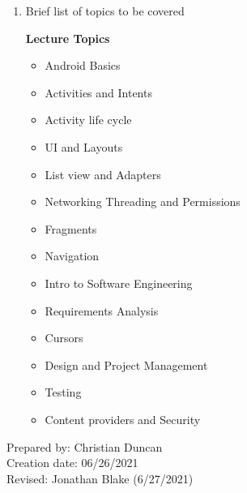 \begin{enumerate}[1.]
\item Brief list of topics to be covered\\
  {\bfseries
    Lecture Topics
    \begin{itemize}
      \item Android Basics
      \item Activities and Intents
      \item Activity life cycle
      \item UI and Layouts
      \item List view and Adapters
      \item Networking Threading and Permissions
      \item Fragments
      \item Navigation
      \item Intro to Software Engineering
      \item Requirements Analysis
      \item Cursors
      \item Design and Project Management
      \item Testing
      \item Content providers and Security
    \end{itemize}
  }

\end{enumerate}

\noindent Prepared by: Christian Duncan\\
\noindent Creation date: 06/26/2021\\
\noindent Revised: Jonathan Blake (6/27/2021)\\
